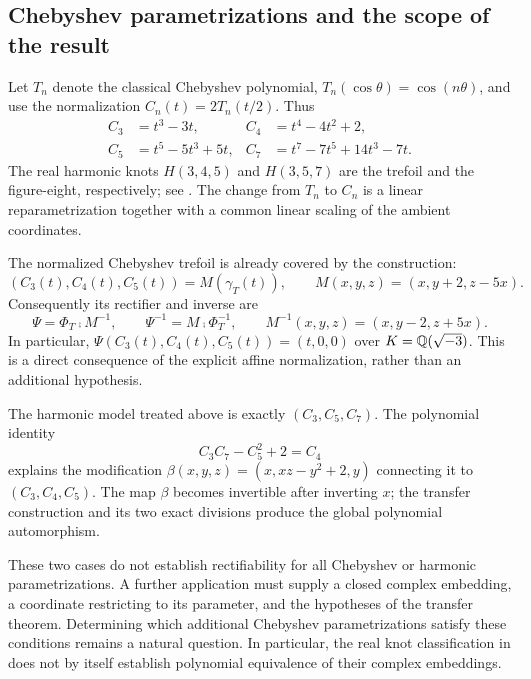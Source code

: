 \subsection{Chebyshev parametrizations and the scope of the result}

Let $T_n$ denote the classical Chebyshev polynomial,
$T_n(\cos\theta)=\cos(n\theta)$, and use the normalization
$C_n(t)=2T_n(t/2)$. Thus
\[
\begin{aligned}
C_3&=t^3-3t, & C_4&=t^4-4t^2+2,\\
C_5&=t^5-5t^3+5t, & C_7&=t^7-7t^5+14t^3-7t.
\end{aligned}
\]
The real harmonic knots $H(3,4,5)$ and $H(3,5,7)$ are the trefoil and
the figure-eight, respectively; see \cite[Introduction and
Definition~1.2]{KP}. The change from $T_n$ to $C_n$ is a linear
reparametrization together with a common linear scaling of the ambient
coordinates.

The normalized Chebyshev trefoil is already covered by the construction:
\[
(C_3(t),C_4(t),C_5(t))=M(\gamma_T(t)),\qquad
M(x,y,z)=(x,y+2,z-5x).
\]
Consequently its rectifier and inverse are
\[
\Psi=\Phi_T\comp M^{-1},\qquad
\Psi^{-1}=M\comp\Phi_T^{-1},\qquad
M^{-1}(x,y,z)=(x,y-2,z+5x).
\]
In particular, $\Psi(C_3(t),C_4(t),C_5(t))=(t,0,0)$ over
$K=\mathbb Q(\sqrt{-3})$. This is a direct consequence of the explicit affine
normalization, rather than an additional hypothesis.

The harmonic model treated above is exactly $(C_3,C_5,C_7)$. The
polynomial identity
\[
C_3C_7-C_5^2+2=C_4
\]
explains the modification
$\beta(x,y,z)=(x,xz-y^2+2,y)$ connecting it to $(C_3,C_4,C_5)$.
The map $\beta$ becomes invertible after inverting $x$; the transfer
construction and its two exact divisions produce the global polynomial
automorphism.

These two cases do not establish rectifiability for all Chebyshev or
harmonic parametrizations. A further application must supply a closed
complex embedding, a coordinate restricting to its parameter, and the
hypotheses of the transfer theorem. Determining which additional
Chebyshev parametrizations satisfy these conditions remains a natural
question. In particular, the real knot classification in \cite{KP}
does not by itself establish polynomial equivalence of their complex
embeddings.
